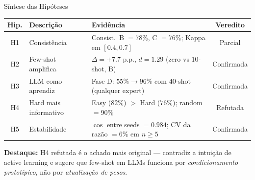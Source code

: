 \documentclass[aspectratio=169,10pt]{beamer}
\begin{document}
\begin{frame}{S\'intese das Hip\'oteses}
  \footnotesize
  \begin{center}
  \begin{tabular}{clp{5.5cm}c}
    \toprule
    \textbf{Hip.} & \textbf{Descri\c{c}\~ao} & \textbf{Evid\^encia} & \textbf{Veredito} \\
    \midrule
    H1 & Consist\^encia & Consist.\ B $= 78\%$, C $= 76\%$; Kappa em $[0.4, 0.7]$ & \color{orange}Parcial \\
    H2 & Few-shot amplifica & $\Delta = +7.7$ p.p., $d = 1.29$ (zero vs 10-shot, B) & \color{green!70!black}Confirmada \\
    H3 & LLM como aprendiz & Fase D: $55\% \to 96\%$ com 40-shot (qualquer expert) & \color{green!70!black}Confirmada \\
    H4 & Hard mais informativo & Easy ($82\%$) $>$ Hard ($76\%$); random $= 90\%$ & \color{red!80!black}Refutada \\
    H5 & Estabilidade & $\cos$ entre seeds $= 0.984$; CV da raz\~ao $= 6\%$ em $n \geq 5$ & \color{green!70!black}Confirmada \\
    \bottomrule
  \end{tabular}
  \end{center}
  \medskip

  \textbf{Destaque:} H4 refutada \'e o achado mais original --- contradiz a intui\c{c}\~ao de active learning e sugere que few-shot em LLMs funciona por \emph{condicionamento prototípico}, n\~ao por \emph{atualiza\c{c}\~ao de pesos}.
\end{frame}

\end{document}
